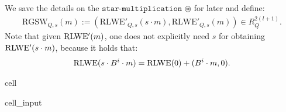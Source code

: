 \documentclass[letterpaper,10pt,english]{jupyterBook}
\begin{document}
\sphinxAtStartPar
We save the details on the \(\texttt{star-multiplication}\) \(\circledast\) for later and define:
\begin{equation*}
\begin{split}\mathrm{RGSW}_{Q,s}(m) := (\mathrm{RLWE'}_{Q,s}(s\cdot m), \mathrm{RLWE'}_{Q,s}(m)) \in R_Q^{2(l+1)}.\end{split}
\end{equation*}
\sphinxAtStartPar
Note that given \(\mathrm{RLWE'}(m)\), one does not explicitly need \(s\) for obtaining \(\mathrm{RLWE'}(s \cdot m)\), because it holds that:
\begin{equation*}
\begin{split}\mathrm{RLWE}(s \cdot B^i \cdot m) = \mathrm{RLWE}(0) + (B^i \cdot m, 0).\end{split}
\end{equation*}
\begin{sphinxuseclass}{cell}\begin{sphinxVerbatimInput}

\begin{sphinxuseclass}{cell_input}
\begin{sphinxVerbatim}[commandchars=\\\{\}]
     
            
     \PYG{p}{[}          \PYG{p}{]}
\end{sphinxVerbatim}

\end{sphinxuseclass}\end{sphinxVerbatimInput}

\end{sphinxuseclass}
\begin{DUlineblock}{0em}
\item[] 
\end{DUlineblock}
\end{document}

